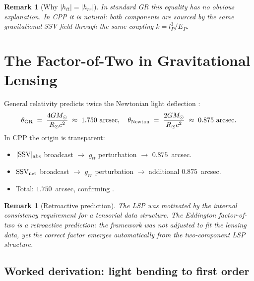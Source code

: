\documentclass[12pt]{article}
\newtheorem{remark}[theorem]{Remark}
\newcommand{\lP}{l_P}
\newcommand{\EP}{E_P}
\newcommand{\SSV}{\text{SSV}}
\begin{document}
\begin{remark}[Why $|h_{tt}| = |h_{rr}|$]
\label{rem:equal}
In standard GR \citep{einstein1915} this equality has no obvious
explanation.  In CPP it is natural: both components are sourced by
the same gravitational SSV field through the same coupling
$k = \lP^3/\EP$.
\end{remark}

\section{The Factor-of-Two in Gravitational Lensing}
\label{sec:lensing}

General relativity predicts twice the Newtonian light deflection
\citep{eddington1920,einstein1915}:
\begin{equation}
  \theta_{\rm GR} \;=\; \frac{4GM_\odot}{R_\odot c^2}
  \;\approx\; 1.750\ \text{arcsec},
  \quad
  \theta_{\rm Newton} \;=\; \frac{2GM_\odot}{R_\odot c^2}
  \;\approx\; 0.875\ \text{arcsec}.
  \label{eq:lensing}
\end{equation}
In CPP the origin is transparent:
\begin{itemize}[noitemsep]
  \item $|\SSV|_{\rm abs}$ broadcast $\to$ $g_{tt}$ perturbation
    $\to$ $0.875$~arcsec.
  \item $\mathbf{\SSV}_{\rm net}$ broadcast $\to$ $g_{rr}$ perturbation
    $\to$ additional $0.875$~arcsec.
  \item Total: $1.750$~arcsec, confirming \citet{eddington1920}.
\end{itemize}

\begin{remark}[Retroactive prediction]
The LSP was motivated by the internal consistency requirement
for a tensorial data structure.  The Eddington factor-of-two
\citep{eddington1920} is a \emph{retroactive} prediction: the
framework was not adjusted to fit the lensing data, yet the correct
factor emerges automatically from the two-component LSP structure.
\end{remark}

\subsection{Worked derivation: light bending to first order}
\label{sec:lensing_worked}
\end{document}
